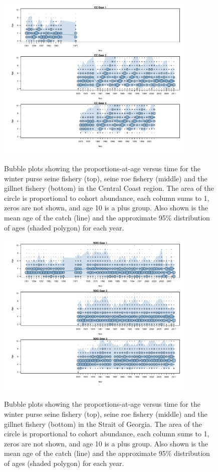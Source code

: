\begin{figure}
	\centering
	\includegraphics[width=0.85\textwidth]{../Figs/iscam_fig_AgeCompsCC.pdf}\\
	\caption{Bubble plots showing the proportions-at-age versus time for the winter purse seine fishery (top), seine roe fishery (middle) and the gillnet fishery (bottom) in the Central Coast region.  The area of the circle is proportional to cohort abundance, each column sums to 1, zeros are not shown, and age 10 is a plus group. Also shown is the mean age of the catch (line) and the approximate 95\% distribution of ages (shaded polygon) for each year.}\label{FigAgeCompsCC}
\end{figure}

\begin{figure}
	\centering
	\includegraphics[width=0.85\textwidth]{../Figs/iscam_fig_AgeCompsSOG.pdf}\\
	\caption{Bubble plots showing the proportions-at-age versus time for the winter purse seine fishery (top), seine roe fishery (middle) and the gillnet fishery (bottom) in the Strait of Georgia.  The area of the circle is proportional to cohort abundance, each column sums to 1, zeros are not shown, and age 10 is a plus group. Also shown is the mean age of the catch (line) and the approximate 95\% distribution of ages (shaded polygon) for each year.}\label{FigAgeCompsSOG}
\end{figure}

